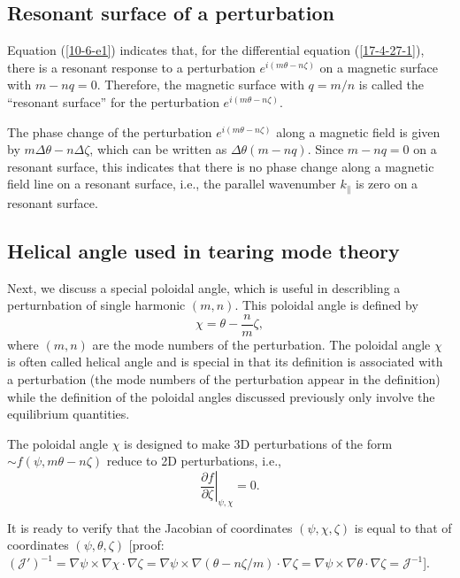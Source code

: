 \documentclass{llncs}
\begin{document}
\subsection{Resonant surface of a perturbation}

Equation (\ref{10-6-e1}) indicates that, for the differential equation
(\ref{17-4-27-1}), there is a resonant response to a perturbation $e^{i (m
\theta - n \zeta)}$ on a magnetic surface with $m - n q = 0$. Therefore, the
magnetic surface with $q = m / n$ is called the ``resonant surface'' for the
perturbation $e^{i (m \theta - n \zeta)}$.

The phase change of the perturbation $e^{i (m \theta - n \zeta)}$ along a
magnetic field is given by $m \Delta \theta - n \Delta \zeta$, which can be
written as $\Delta \theta (m - n q)$. Since $m - n q = 0$ on a resonant
surface, this indicates that there is no phase change along a magnetic field
line on a resonant surface, i.e., the parallel wavenumber $k_{\parallel}$ is
zero on a resonant surface.

\subsection{Helical angle used in tearing mode theory}

Next, we discuss a special poloidal angle, which is useful in describling a
perturnbation of single harmonic $(m, n)$. This poloidal angle is defined by
\begin{equation}
  \chi = \theta - \frac{n}{m} \zeta,
\end{equation}
where $(m, n)$ are the mode numbers of the perturbation. The poloidal angle
$\chi$ is often called helical angle and is special in that its definition is
associated with a perturbation (the mode numbers of the perturbation appear in
the definition) while the definition of the poloidal angles discussed
previously only involve the equilibrium quantities.

The poloidal angle $\chi$ is designed to make 3D perturbations of the form
$\sim f (\psi, m \theta - n \zeta)$ reduce to 2D perturbations, i.e.,
\begin{equation}
  \left. \frac{\partial f}{\partial \zeta} \right|_{\psi, \chi} = 0.
\end{equation}


It is ready to verify that the Jacobian of coordinates $(\psi, \chi, \zeta)$
is equal to that of coordinates $(\psi, \theta, \zeta)$ [proof:
$(\mathcal{J}')^{- 1} = \nabla \psi \times \nabla \chi \cdot \nabla \zeta =
\nabla \psi \times \nabla (\theta - n \zeta / m) \cdot \nabla \zeta = \nabla
\psi \times \nabla \theta \cdot \nabla \zeta =\mathcal{J}^{- 1}$].
\end{document}
